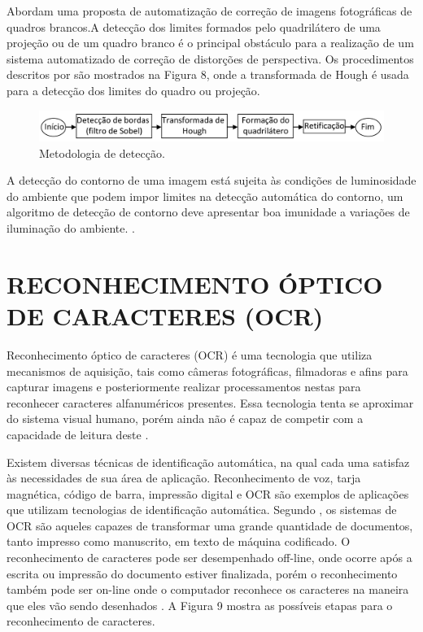  Abordam uma proposta de automatização de correção de imagens fotográficas de quadros brancos.A detecção dos limites formados pelo quadrilátero de uma projeção ou de um quadro branco é o principal obstáculo para a realização de um sistema automatizado de correção de distorções de perspectiva. Os procedimentos descritos por  são mostrados na Figura 8, onde a transformada de Hough é usada para a detecção dos limites do quadro ou projeção.

 \begin{figure}[h]
	\centering
	\includegraphics[width=1.0\textwidth]{Imagens/metodologiacorrecao} 
	\caption[Metodologia de detecção.]{Metodologia de detecção.}
	\label{fig:tux_laplace}
\end{figure}

A detecção do contorno de uma imagem está sujeita às condições de luminosidade do ambiente que podem impor limites na detecção automática do contorno, um algoritmo de detecção de contorno deve apresentar boa imunidade a variações de iluminação do ambiente. \cite{Pereira}.


\section{RECONHECIMENTO ÓPTICO DE CARACTERES (OCR)}
Reconhecimento óptico de caracteres (OCR) é uma tecnologia que utiliza mecanismos de aquisição, tais como câmeras fotográficas, filmadoras e afins para capturar imagens e posteriormente realizar processamentos nestas para reconhecer caracteres alfanuméricos presentes. Essa tecnologia tenta se aproximar do sistema visual humano, porém ainda não é capaz de competir com a capacidade de leitura deste \cite{Mithe2013}.

 Existem diversas técnicas de identificação automática, na qual cada uma satisfaz às necessidades de sua área de aplicação. Reconhecimento de voz, tarja magnética, código de barra, impressão digital e OCR são exemplos de aplicações que utilizam tecnologias de identificação automática. Segundo , os sistemas de OCR são aqueles capazes de transformar uma grande quantidade de documentos, tanto impresso como manuscrito, em texto de máquina codificado. O reconhecimento de caracteres pode ser desempenhado off-line, onde ocorre após a escrita ou impressão do documento estiver finalizada, porém o reconhecimento também pode ser on-line onde o computador reconhece os caracteres na maneira que eles vão sendo desenhados \cite{Eikvil1993}. A Figura 9 mostra as possíveis etapas para o reconhecimento de caracteres.

